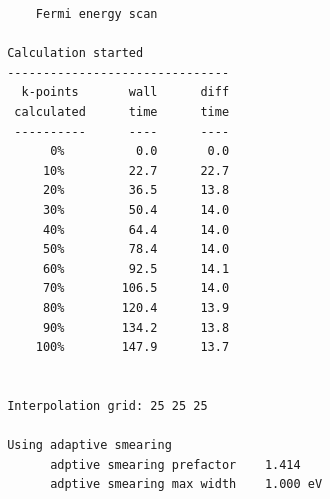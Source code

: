 \begin{itemize}
\begin{tcolorbox}[title=Pt.wpout,sharp corners,boxrule=0.5pt]
{\begin{verbatim}
     Fermi energy scan
 
 Calculation started
 -------------------------------
   k-points       wall      diff
  calculated      time      time
  ----------      ----      ----
       0%          0.0       0.0
      10%         22.7      22.7
      20%         36.5      13.8
      30%         50.4      14.0
      40%         64.4      14.0
      50%         78.4      14.0
      60%         92.5      14.1
      70%        106.5      14.0
      80%        120.4      13.9
      90%        134.2      13.8
     100%        147.9      13.7


 Interpolation grid: 25 25 25

 Using adaptive smearing
       adptive smearing prefactor    1.414
       adptive smearing max width    1.000 eV
       
\end{verbatim}
}
\end{tcolorbox}

\end{itemize}

